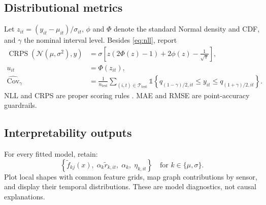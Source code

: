 \documentclass[11pt]{article}
\newcommand{\crps}{\operatorname{CRPS}}
\begin{document}
\subsection{Distributional metrics}

Let $z_{it}=(y_{it}-\mu_{it})/\sigma_{it}$, $\phi$ and $\Phi$ denote the
standard Normal density and CDF, and $\gamma$ the nominal interval level.
Besides \cref{eq:nll}, report
\begin{align}
  \crps\!\left(\mathcal{N}(\mu,\sigma^2),y\right)
    &=
    \sigma\left[
      z(2\Phi(z)-1)+2\phi(z)-\frac{1}{\sqrt{\pi}}
    \right],                                                        \label{eq:crps}\\
  u_{it}
    &= \Phi(z_{it}),                                                 \label{eq:pit}\\
  \widehat{\operatorname{Cov}}_{\gamma}
    &=
    \frac{1}{n_{\mathrm{test}}}
    \sum_{(i,t)\in\mathcal{T}_{\mathrm{test}}}
    \mathbb{1}\!\left\{
      q_{(1-\gamma)/2,it}\le y_{it}\le q_{(1+\gamma)/2,it}
    \right\}.                                                       \label{eq:coverage}
\end{align}
NLL and CRPS are proper scoring rules \citep{gneiting2007scoring}. MAE and RMSE
are point-accuracy guardrails.

\subsection{Interpretability outputs}

For every fitted model, retain:
\begin{equation}
  \left\{
    \widetilde f_{kj}(x),\;
    \alpha_k\widetilde r_{k,it},\;
    \alpha_k,\;
    \eta_{k,it}
  \right\}
  \quad
  \text{for }k\in\{\mu,\sigma\}.
  \label{eq:interpretability-artifacts}
\end{equation}
Plot local shapes with common feature grids, map graph contributions by sensor,
and display their temporal distributions. These are model diagnostics, not
causal explanations.
\end{document}
